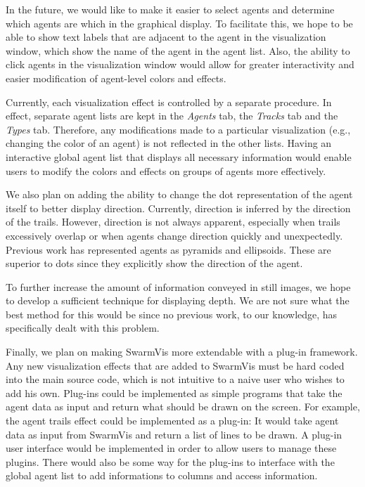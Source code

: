 \documentclass[conference]{IEEEtran}
\begin{document}
In the future, we would like to make it easier to select agents and determine which agents are which in the graphical display.
To facilitate this, we hope to be able to show text labels that are adjacent to the agent in the visualization window, which
show the name of the agent in the agent list.
Also, the ability to click agents in the visualization window would allow for greater
interactivity and easier modification of agent-level colors and effects.

Currently, each visualization effect is controlled by a separate procedure.
In effect, separate agent lists are kept in the \textit{Agents} tab, the \textit{Tracks} tab and the \textit{Types} tab.
Therefore, any modifications made to a particular visualization (e.g., changing the color of an agent) is not reflected in the other lists.
Having an interactive global agent list that displays all necessary information would enable users to modify
the colors and effects on groups of agents more effectively. 

We also plan on adding the ability to change the dot representation of the agent itself to better display direction.
Currently, direction is inferred by the direction of the trails.
However, direction is not always apparent,
especially when trails excessively overlap or when agents change direction quickly and unexpectedly.
Previous work has represented agents as  pyramids\cite{spector2005ecb}  and ellipsoids\cite{10.1109/TVCG.2005.87}.
These are superior to dots since they explicitly show the direction of the agent.

To further increase the amount of information conveyed in still images,
we hope to develop a sufficient technique for displaying depth.
We are not sure what the best method for this would be since no previous work, to our knowledge,
has specifically dealt with this problem.

Finally, we plan on making SwarmVis more extendable with a plug-in framework.
Any new visualization effects that are added to SwarmVis must be hard coded into the main source code, which
is not intuitive to a naive user who wishes to add his own.
Plug-ins could be implemented as simple programs that take the agent data as input and return
what should be drawn on the screen.
For example, the agent trails effect could be implemented as a plug-in:
It would take agent data as input from SwarmVis and return a list of lines to be drawn.
A plug-in user interface would be implemented in order to allow users to manage these plugins.
There would also be some way for the plug-ins to interface with the global agent list to add informations to columns
and access information.
\end{document}

